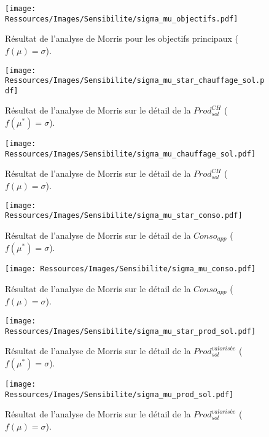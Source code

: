 

\begin{landscape}

\begin{figure}
    \centering
    \texttt{[image: Ressources/Images/Sensibilite/sigma\_mu\_objectifs.pdf]}
    \caption{Résultat de l’analyse de Morris pour les objectifs principaux
             ($f(\mu) = \sigma$).
             \label{fig:objectifs_mu}}
\end{figure}

\begin{figure}
    \centering
    \texttt{[image: Ressources/Images/Sensibilite/sigma\_mu\_star\_chauffage\_sol.pdf]}
    \caption{Résultat de l’analyse de Morris sur le détail de la
             $Prod_{sol}^{CH}$ ($f(\mu^{*}) = \sigma$).
             \label{fig:prod_sol_chauffage_mu_star}}
\end{figure}

\begin{figure}
    \centering
    \texttt{[image: Ressources/Images/Sensibilite/sigma\_mu\_chauffage\_sol.pdf]}
    \caption{Résultat de l’analyse de Morris sur le détail de la
             $Prod_{sol}^{CH}$ ($f(\mu) = \sigma$).
             \label{fig:prod_sol_chauffage_mu}}
\end{figure}


\begin{figure}
    \centering
    \texttt{[image: Ressources/Images/Sensibilite/sigma\_mu\_star\_conso.pdf]}
    \caption{Résultat de l’analyse de Morris sur le détail de la
             $Conso_{app}$ ($f(\mu^{*}) = \sigma$).
             \label{fig:conso_app_mu_star}}
\end{figure}

\begin{figure}
    \centering
    \texttt{[image: Ressources/Images/Sensibilite/sigma\_mu\_conso.pdf]}
    \caption{Résultat de l’analyse de Morris sur le détail de la
             $Conso_{app}$ ($f(\mu) = \sigma$).
             \label{fig:conso_app_mu}}
\end{figure}

\begin{figure}
    \centering
    \texttt{[image: Ressources/Images/Sensibilite/sigma\_mu\_star\_prod\_sol.pdf]}
    \caption{Résultat de l’analyse de Morris sur le détail de la
             $Prod_{sol}^{valorisée}$ ($f(\mu^{*}) = \sigma$).
             \label{fig:prod_sol_valorisee_mu_star}}
\end{figure}

\begin{figure}
    \centering
    \texttt{[image: Ressources/Images/Sensibilite/sigma\_mu\_prod\_sol.pdf]}
    \caption{Résultat de l’analyse de Morris sur le détail de la
             $Prod_{sol}^{valorisée}$ ($f(\mu) = \sigma$).
             \label{fig:prod_sol_valorisee_mu}}
\end{figure}

\end{landscape}
